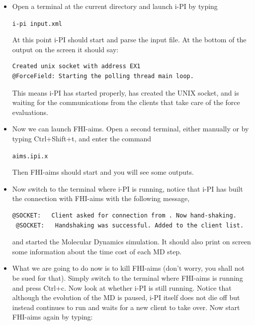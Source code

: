 \documentclass[a4paper,11pt]{scrartcl}
\def\IPI{i-pi input.xml}
\def\FHI{aims.ipi.x}
\begin{document}
\begin{itemize}
 \item Open a terminal at the current directory and launch i-PI by typing
 \begin{center}
   \texttt{\IPI}
\end{center}

 At this point i-PI should start and parse the input file. At the bottom of the
output on the screen it should say:

\begin{lstlisting}[language=bash]
Created unix socket with address EX1
@ForceField: Starting the polling thread main loop.
\end{lstlisting}
This means i-PI has started properly, has created the UNIX socket, and is
waiting for the communications from the clients that take care of the force evaluations.

 \item Now we can launch FHI-aims. Open a second terminal, either
manually or by typing Ctrl+Shift+t, and enter the command
 
 \begin{center}
   \texttt{\FHI}
\end{center}

Then FHI-aims should start and you will see some outputs.

\item

Now switch to the terminal where i-PI is running, notice that i-PI has built
the connection with FHI-aims with the following message,

\begin{lstlisting}[language=bash]
 @SOCKET:   Client asked for connection from . Now hand-shaking.
 @SOCKET:   Handshaking was successful. Added to the client list.
\end{lstlisting}

and started the Molecular Dynamics simulation. It should also print on screen some
information about the time cost of each MD step.

\item What we are going to do now is to kill FHI-aims (don't worry, you shall not be sued for that). 
Simply switch to the terminal where FHI-aims is running and press Ctrl+c. Now look at whether i-PI
is still running. Notice that although the evolution of the MD is paused, i-PI itself
does not die off but instead continues to run and waits for a new client to take
over. Now start FHI-aims again by typing:


\end{itemize}
\end{document}
